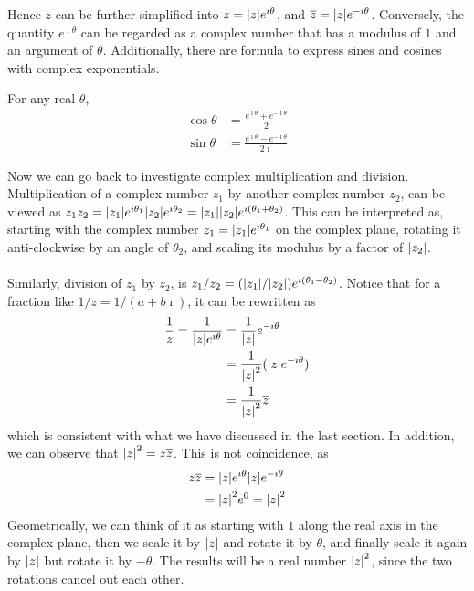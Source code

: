 Hence $z$ can be further simplified into $z = \abs{z} e^{\imath \theta}$, and $\overline{z} = \abs{z} e^{-\imath \theta}$. Conversely, the quantity $e^{\imath \theta}$ can be regarded as a complex number that has a modulus of $1$ and an argument of $\theta$. Additionally, there are formula to express sines and cosines with complex exponentials.
\begin{proper}
\label{sincoscomplex}
For any real $\theta$,
\begin{align*}
\cos \theta &= \frac{e^{\imath\theta} + e^{-\imath\theta}}{2} \\
\sin \theta &= \frac{e^{\imath\theta} - e^{-\imath\theta}}{2\imath}
\end{align*}
\end{proper}
Now we can go back to investigate complex multiplication and division. Multiplication of a complex number $z_1$ by another complex number $z_2$, can be viewed as $z_1z_2 = \abs{z_1}e^{\imath \theta_1} \abs{z_2} e^{\imath \theta_2} = \abs{z_1}\abs{z_2}e^{\imath (\theta_1+\theta_2)}$. This can be interpreted as, starting with the complex number $z_1 = \abs{z_1}e^{\imath \theta_1}$ on the complex plane, rotating it anti-clockwise by an angle of $\theta_2$, and scaling its modulus by a factor of $\abs{z_2}$. \\
\\
Similarly, division of $z_1$ by $z_2$, is $z_1/z_2 = (\abs{z_1}/\abs{z_2})e^{\imath (\theta_1-\theta_2)}$. Notice that for a fraction like $1/z = 1/(a+b\imath)$, it can be rewritten as
\begin{align*}
\frac{1}{z} = \frac{1}{\abs{z}e^{\imath \theta}} &= \frac{1}{\abs{z}} e^{-\imath \theta} \\
&= \frac{1}{\abs{z}^2} (\abs{z} e^{-\imath \theta}) \\
&= \frac{1}{\abs{z}^2} \overline{z}
\end{align*}
which is consistent with what we have discussed in the last section. In addition, we can observe that $\abs{z}^2 = z\overline{z}$. This is not coincidence, as
\begin{align*}
z\overline{z} &= \abs{z} e^{\imath \theta} \abs{z} e^{-\imath \theta} \\
&= \abs{z}^2 e^{0} = \abs{z}^2
\end{align*}
Geometrically, we can think of it as starting with $1$ along the real axis in the complex plane, then we scale it by $\abs{z}$ and rotate it by $\theta$, and finally scale it again by $\abs{z}$ but rotate it by $-\theta$. The results will be a real number $\abs{z}^2$, since the two rotations cancel out each other.\\
